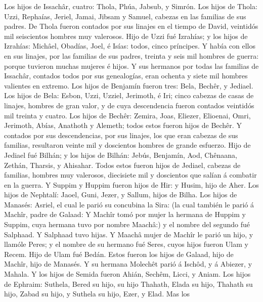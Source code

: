  Los hijos de Issachâr, cuatro: Thola, Phúa, Jabsub, y
Simrón.  Los hijos de Thola: Uzzi, Rephaías, Jeriel, Jamai,
Jibsam y Samuel, cabezas en las familias de sus padres. De Thola fueron
contados por sus linajes en el tiempo de David, veintidós mil
seiscientos hombres muy valerosos.  Hijo de Uzzi fué
Izrahías; y los hijos de Izrahías: Michâel, Obadías, Joel, é Isías:
todos, cinco príncipes.  Y había con ellos en sus linajes,
por las familias de sus padres, treinta y seis mil hombres de guerra:
porque tuvieron muchas mujeres é hijos.  Y sus hermanos por
todas las familias de Issachâr, contados todos por sus genealogías, eran
ochenta y siete mil hombres valientes en extremo.  Los hijos
de Benjamín fueron tres: Bela, Bechêr, y Jediael.  Los hijos
de Bela: Esbon, Uzzi, Uzziel, Jerimoth, é Iri; cinco cabezas de casas de
linajes, hombres de gran valor, y de cuya descendencia fueron contados
veintidós mil treinta y cuatro.  Los hijos de Bechêr:
Zemira, Joas, Eliezer, Elioenai, Omri, Jerimoth, Abías, Anathoth y
Alemeth; todos estos fueron hijos de Bechêr.  Y contados por
sus descendencias, por sus linajes, los que eran cabezas de sus
familias, resultaron veinte mil y doscientos hombres de grande esfuerzo.
 Hijo de Jediael fué Bilhán; y los hijos de Bilhán: Jebús,
Benjamín, Aod, Chênaana, Zethán, Tharsis, y Ahisahar. 
Todos estos fueron hijos de Jediael, cabezas de familias, hombres muy
valerosos, diecisiete mil y doscientos que salían á combatir en la
guerra.  Y Suppim y Huppim fueron hijos de Hir: y Husim,
hijo de Aher.  Los hijos de Nephtalí: Jaoel, Guni, Jezer, y
Sallum, hijos de Bilha.  Los hijos de Manasés: Asriel, el
cual le parió su concubina la Sira: (la cual también le parió á Machîr,
padre de Galaad:  Y Machîr tomó por mujer la hermana de
Huppim y Suppim, cuya hermana tuvo por nombre Maachâ:) y el nombre del
segundo fué Salphaad. Y Salphaad tuvo hijas.  Y Maachâ
mujer de Machîr le parió un hijo, y llamóle Peres; y el nombre de su
hermano fué Seres, cuyos hijos fueron Ulam y Recem.  Hijo
de Ulam fué Bedán. Estos fueron los hijos de Galaad, hijo de Machîr,
hijo de Manasés.  Y su hermana Molechêt parió á Ischôd, y á
Abiezer, y Mahala.  Y los hijos de Semida fueron Ahián,
Sechêm, Licci, y Aniam.  Los hijos de Ephraim: Suthela,
Bered su hijo, su hijo Thahath, Elada su hijo, Thahath su hijo,
 Zabad su hijo, y Suthela su hijo, Ezer, y Elad. Mas los
